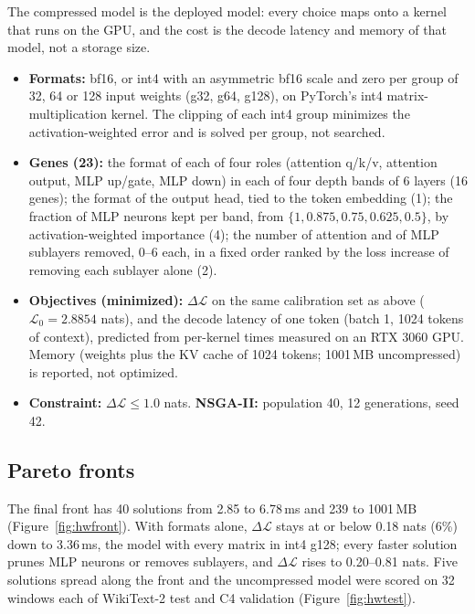 \documentclass[11pt]{article}
\newcommand{\dloss}{\Delta\mathcal{L}}
\begin{document}
The compressed model is the deployed model: every choice maps onto a kernel that runs on the GPU, and
the cost is the decode latency and memory of that model, not a storage size.
\begin{itemize}
  \item \textbf{Formats:} bf16, or int4 with an asymmetric bf16 scale and zero per group of 32, 64 or
        128 input weights (g32, g64, g128), on PyTorch's int4 matrix-multiplication kernel. The
        clipping of each int4 group minimizes the activation-weighted error and is solved per group,
        not searched.
  \item \textbf{Genes (23):} the format of each of four roles (attention q/k/v, attention output, MLP
        up/gate, MLP down) in each of four depth bands of 6 layers (16 genes); the format of the output
        head, tied to the token embedding (1); the fraction of MLP neurons kept per band, from
        $\{1, 0.875, 0.75, 0.625, 0.5\}$, by activation-weighted importance (4); the number of attention
        and of MLP sublayers removed, 0--6 each, in a fixed order ranked by the loss increase of removing
        each sublayer alone (2).
  \item \textbf{Objectives (minimized):} $\dloss$ on the same calibration set as above
        ($\mathcal{L}_0 = 2.8854$ nats), and the decode latency of one token (batch 1, 1024 tokens of
        context), predicted from per-kernel times measured on an RTX 3060 GPU. Memory (weights plus the
        KV cache of 1024 tokens; 1001\,MB uncompressed) is reported, not optimized.
  \item \textbf{Constraint:} $\dloss \le 1.0$ nats. \textbf{NSGA-II:} population 40, 12 generations,
        seed 42.
\end{itemize}

\subsection{Pareto fronts}

The final front has 40 solutions from 2.85 to 6.78\,ms and 239 to 1001\,MB (Figure~\ref{fig:hwfront}).
With formats alone, $\dloss$ stays at or below 0.18 nats (6\%) down to 3.36\,ms, the model with every
matrix in int4 g128; every faster solution prunes MLP neurons or removes sublayers, and $\dloss$ rises
to 0.20--0.81 nats. Five solutions spread along the front and the uncompressed model were scored on 32
windows each of WikiText-2 test and C4 validation (Figure~\ref{fig:hwtest}).
\end{document}
